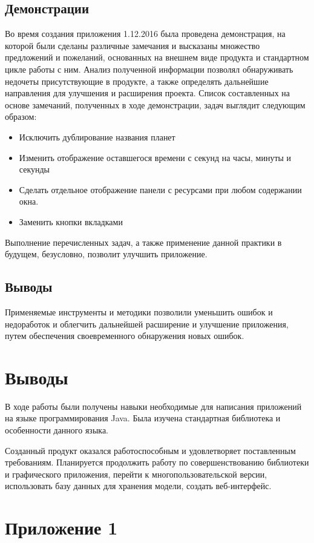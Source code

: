 \subsection{Демонстрации}

Во время создания приложения 1.12.2016 была проведена демонстрация, на которой были сделаны различные замечания и высказаны множество предложений и пожеланий, основанных на внешнем виде продукта и стандартном цикле работы с ним. Анализ полученной информации позволял обнаруживать недочеты присутствующие в продукте, а также определять дальнейшие направления для улучшения и расширения проекта. Список составленных на основе замечаний, полученных в ходе демонстрации, задач выглядит следующим образом:
\begin{itemize}
\item Исключить дублирование названия планет
\item Изменить отображение оставшегося времени с секунд на часы, минуты и секунды
\item Сделать отдельное отображение панели с ресурсами при любом содержании окна.
\item Заменить кнопки вкладками
\end{itemize}

Выполнение перечисленных задач, а также применение данной практики в будущем, безусловно, позволит улучшить приложение.

\subsection{Выводы}
Применяемые инструменты и методики позволили уменьшить ошибок и недоработок и облегчить дальнейшей расширение и улучшение приложения, путем обеспечения своевременного обнаружения новых ошибок. 

\section{Выводы}
В ходе работы были получены навыки необходимые для написания приложений на языке программирования Java. Была изучена стандартная библиотека и особенности данного языка.

Созданный продукт оказался работоспособным и удовлетворяет поставленным требованиям. Планируется продолжить работу по совершенствованию библиотеки и графического приложения, перейти к многопользовательской версии, использовать базу данных для хранения модели, создать веб-интерфейс.

\section{Приложение 1}
\label{sec:listings}


